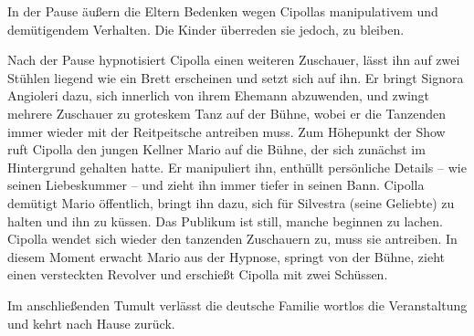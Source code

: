 {In der Pause äußern die Eltern Bedenken wegen Cipollas manipulativem und demütigendem Verhalten. Die Kinder überreden sie jedoch, zu bleiben.

Nach der Pause hypnotisiert Cipolla einen weiteren Zuschauer, lässt ihn auf zwei Stühlen liegend wie ein Brett erscheinen und setzt sich auf ihn. Er bringt Signora Angioleri dazu, sich innerlich von ihrem Ehemann abzuwenden, und zwingt mehrere Zuschauer zu groteskem Tanz auf der Bühne, wobei er die Tanzenden immer wieder mit der Reitpeitsche antreiben muss. 
Zum Höhepunkt der Show ruft Cipolla den jungen Kellner Mario auf die Bühne, der sich zunächst im Hintergrund gehalten hatte. Er manipuliert ihn, enthüllt persönliche Details – wie seinen Liebeskummer – und zieht ihn immer tiefer in seinen Bann. Cipolla demütigt Mario öffentlich, bringt ihn dazu, sich für Silvestra (seine Geliebte) zu halten und ihn zu küssen. Das Publikum ist still, manche beginnen zu lachen. Cipolla wendet sich wieder den tanzenden Zuschauern zu, muss sie antreiben. In diesem Moment erwacht Mario aus der Hypnose, springt von der Bühne, zieht einen versteckten Revolver und erschießt Cipolla mit zwei Schüssen.

Im anschließenden Tumult verlässt die deutsche Familie wortlos die Veranstaltung und kehrt nach Hause zurück.
}


